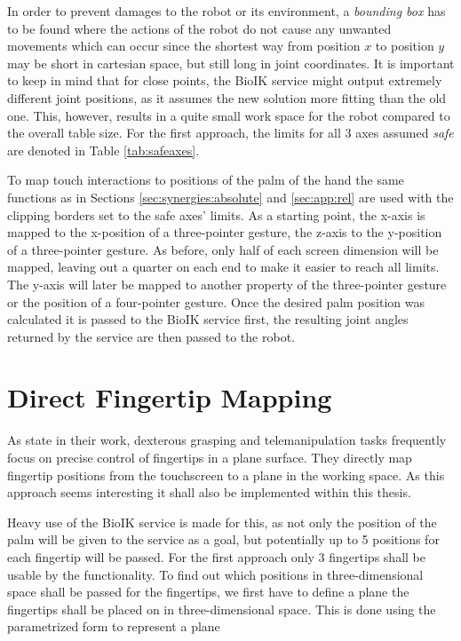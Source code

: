 In order to prevent damages to the robot or its environment, a \textit{bounding box} has to be found where the actions of the robot do not cause any unwanted movements which can occur since the shortest way from position $x$ to position $y$ may be short in cartesian space, but still long in joint coordinates. It is important to keep in mind that for close points, the BioIK service might output extremely different joint positions, as it assumes the new solution more fitting than the old one. This, however, results in a quite small work space for the robot compared to the overall table size. For the first approach, the limits for all 3 axes assumed \textit{safe} are denoted in Table \ref{tab:safeaxes}.

To map touch interactions to positions of the palm of the hand the same functions as in Sections \ref{sec:synergies:absolute} and \ref{sec:app:rel} are used with the clipping borders set to the safe axes' limits. As a starting point, the x-axis is mapped to the x-position of a three-pointer gesture, the z-axis to the y-position of a three-pointer gesture. As before, only half of each screen dimension will be mapped, leaving out a quarter on each end to make it easier to reach all limits. The y-axis will later be mapped to another property of the three-pointer gesture or the position of a four-pointer gesture. Once the desired palm position was calculated it is passed to the BioIK service first, the resulting joint angles returned by the service are then passed to the robot.

\section{Direct Fingertip Mapping}
\label{sec:conc:dftm}
As \citeauthor{conf:humanoids:TohHLBZP12} \cite{conf:humanoids:TohHLBZP12} state in their work, dexterous grasping and telemanipulation tasks frequently focus on precise control of fingertips in a plane surface. They directly map fingertip positions from the touchscreen to a plane in the working space. As this approach seems interesting it shall also be implemented within this thesis.

Heavy use of the BioIK service is made for this, as not only the position of the palm will be given to the service as a goal, but potentially up to 5 positions for each fingertip will be passed. For the first approach only 3 fingertips shall be usable by the functionality. To find out which positions in three-dimensional space shall be passed for the fingertips, we first have to define a plane the fingertips shall be placed on in three-dimensional space. This is done using the parametrized form to represent a plane 

